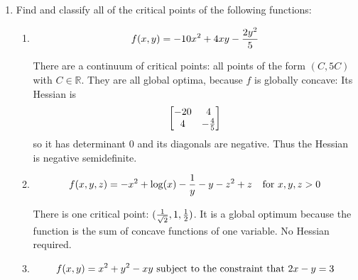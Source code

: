 \documentclass[11pt]{article}
\begin{document}
\begin{enumerate}
\begin{enumerate}
\item Find the rank of 
$$\begin{bmatrix} 
1& 1& 5\\
0& 2& 4\\
-2& 0& -6\\
1& 9& 21
\end{bmatrix}$$

It is 2.

\item Check whether the following matrix is positive definite, positive semidefinite, negative definite, negative semidefinite, or none of the above.
$$\begin{bmatrix}
1& 1& 2\\1& 0& 1\\2& 1& 0
\end{bmatrix}$$

It is none of the above (the 2X2 principal minors aren't positive for $A$ or non-negative for $-A$.).
\end{enumerate}

\vspace{.2in}

\item Find and classify all of the critical points of the following functions:

\begin{enumerate}

\item  $$f(x, y)=-10x^2+4xy-{{2y^2}\over 5}$$

There are a continuum of critical points: all points of the form $(C, 5C)$ with $C\in \mathbb{R}$.  They are all global optima, because $f$ is globally concave: Its Hessian is $$\begin{bmatrix}-20 & 4\\4& -{4\over 5}\end{bmatrix}$$ so it has determinant 0 and its diagonals are negative.  Thus the Hessian is negative semidefinite.

\item $$f(x, y, z)=-x^2+{\log}(x)-{1\over y}-y-z^2+z \hspace{.1in}\hbox{ for }x, y, z>0$$

 There is one critical point: $({1\over \sqrt{2}}, 1, {1\over 2})$.  It is a global optimum because the function is the sum of concave functions of one variable.  No Hessian required.

\item $$f(x, y)=x^2+y^2-xy \hbox{ subject to the constraint that }2x-y=3$$


\end{enumerate}
\end{enumerate}
\end{document}
